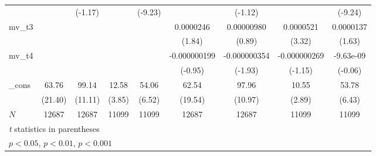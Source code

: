 {\begin{tabular}{l*{8}{c}}
            &                     &     (-1.17)         &                     &     (-9.23)         &                     &     (-1.12)         &                     &     (-9.24)         \\
[1em]
mv\_t3       &                     &                     &                     &                     &   0.0000246         &  0.00000980         &   0.0000521\sym{***}&   0.0000137         \\
            &                     &                     &                     &                     &      (1.84)         &      (0.89)         &      (3.32)         &      (1.63)         \\
[1em]
mv\_t4       &                     &                     &                     &                     &-0.000000199         &-0.000000354         &-0.000000269         &   -9.63e-09         \\
            &                     &                     &                     &                     &     (-0.95)         &     (-1.93)         &     (-1.15)         &     (-0.06)         \\
[1em]
\_cons      &       63.76\sym{***}&       99.14\sym{***}&       12.58\sym{***}&       54.06\sym{***}&       62.54\sym{***}&       97.96\sym{***}&       10.55\sym{**} &       53.78\sym{***}\\
            &     (21.40)         &     (11.11)         &      (3.85)         &      (6.52)         &     (19.54)         &     (10.97)         &      (2.89)         &      (6.43)         \\
\hline
\(N\)       &       12687         &       12687         &       11099         &       11099         &       12687         &       12687         &       11099         &       11099         \\
\hline\hline
\multicolumn{9}{l}{\footnotesize \textit{t} statistics in parentheses}\\
\multicolumn{9}{l}{\footnotesize \sym{*} \(p<0.05\), \sym{**} \(p<0.01\), \sym{***} \(p<0.001\)}\\
\end{tabular}
}
